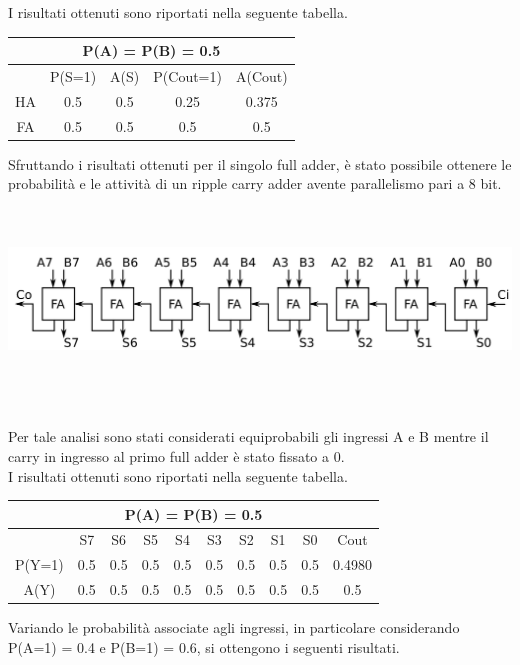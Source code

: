 \documentclass[11pt,  english, makeidx, a4paper, titlepage, oneside]{book}
\begin{document}
I risultati ottenuti sono riportati nella seguente tabella.
\vspace{0.3cm}
\begin{center}
	\begin{tabular}{|c|c|c|c|c|}
	\multicolumn{5}{c}{P(A) = P(B) = 0.5 }\\
	\hline
	  & P(S=1) & A(S) & P(Cout=1) & A(Cout) \\ 
	\hline
	HA & 0.5 & 0.5 & 0.25 & 0.375 \\
	\hline
	FA & 0.5 & 0.5 & 0.5 & 0.5 \\
	\hline
	\end{tabular}
\end{center}
\vspace{0.3cm}
Sfruttando i risultati ottenuti per il singolo full adder, è stato possibile ottenere le probabilità e le attività di un ripple carry adder avente parallelismo pari a 8 bit.
\\\\\\
\centerline{\includegraphics[width=15cm]{./img/Lab_1/Es_2/RCA_8_bit.png}}
\\\\\\
Per tale analisi sono stati considerati equiprobabili gli ingressi A e B mentre il carry in ingresso al primo full adder è stato fissato a 0.\\
I risultati ottenuti sono riportati nella seguente tabella.
\vspace{0.3cm}
\begin{center}
\begin{tabular}{|c|c|c|c|c|c|c|c|c|c|}
\hline
\multicolumn{10}{c}{P(A) = P(B) = 0.5}\\
\hline
 & S7 & S6 & S5 & S4 & S3 & S2 & S1 & S0 & Cout \\
\hline
P(Y=1) & 0.5 & 0.5 & 0.5 & 0.5 & 0.5 & 0.5 & 0.5 & 0.5 & 0.4980 \\
\hline
A(Y) & 0.5 & 0.5 & 0.5 & 0.5 & 0.5 & 0.5 & 0.5 & 0.5 & 0.5 \\
\hline
\end{tabular}
\end{center}
\vspace{0.3cm}
Variando le probabilità associate agli ingressi, in particolare considerando P(A=1) = 0.4 e P(B=1) = 0.6, si ottengono i seguenti risultati.
\end{document}
